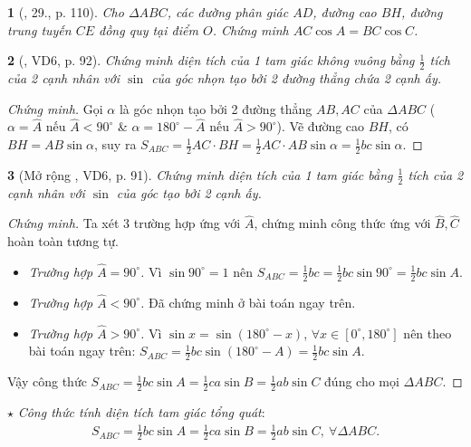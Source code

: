\documentclass{article}
\newtheorem{baitoan}{}
\begin{document}
\begin{baitoan}[\cite{Tuyen_Toan_9_old}, 29., p. 110]
	Cho $\Delta ABC$, các đường phân giác $AD$, đường cao $BH$, đường trung tuyến $CE$ đồng quy tại điểm $O$. Chứng minh $AC\cos A = BC\cos C$.
\end{baitoan}

\begin{baitoan}[\cite{Binh_Toan_9_tap_1}, VD6, p. 92]
	Chứng minh diện tích của 1 tam giác không vuông bằng $\frac{1}{2}$ tích của 2 cạnh nhân với $\sin$ của góc nhọn tạo bởi 2 đường thẳng chứa 2 cạnh ấy.
\end{baitoan}

\begin{proof}[Chứng minh]
	Gọi $\alpha$ là góc nhọn tạo bởi 2 đường thẳng $AB,AC$ của $\Delta ABC$ ($\alpha = \widehat{A}$ nếu $\widehat{A} < 90^\circ$ \& $\alpha = 180^\circ - \widehat{A}$ nếu $\widehat{A} > 90^\circ$). Vẽ đường cao $BH$, có $BH = AB\sin\alpha$, suy ra $S_{ABC} = \frac{1}{2}AC\cdot BH = \frac{1}{2}AC\cdot AB\sin\alpha = \frac{1}{2}bc\sin\alpha$.
\end{proof}

\begin{baitoan}[Mở rộng \cite{Binh_Toan_9_tap_1}, VD6, p. 91]
	Chứng minh diện tích của 1 tam giác bằng $\frac{1}{2}$ tích của 2 cạnh nhân với $\sin$ của góc tạo bởi 2 cạnh ấy.
\end{baitoan}

\begin{proof}[Chứng minh]
	Ta xét 3 trường hợp ứng với $\widehat{A}$, chứng minh công thức ứng với $\widehat{B},\widehat{C}$ hoàn toàn tương tự.
	\begin{itemize}
		\item \textit{Trường hợp $\widehat{A} = 90^\circ$.} Vì $\sin90^\circ = 1$ nên $S_{ABC} = \frac{1}{2}bc = \frac{1}{2}bc\sin90^\circ = \frac{1}{2}bc\sin A$.
		\item \textit{Trường hợp $\widehat{A} < 90^\circ$.} Đã chứng minh ở bài toán ngay trên.
		\item \textit{Trường hợp $\widehat{A} > 90^\circ$.} Vì $\sin x = \sin(180^\circ - x)$, $\forall x\in[0^\circ,180^\circ]$ nên theo bài toán ngay trên: $S_{ABC} = \frac{1}{2}bc\sin(180^\circ - A) = \frac{1}{2}bc\sin A$.
	\end{itemize}
	Vậy công thức $S_{ABC} = \frac{1}{2}bc\sin A = \frac{1}{2}ca\sin B = \frac{1}{2}ab\sin C$ đúng cho mọi $\Delta ABC$.
\end{proof}
\noindent$\star$ \textit{Công thức tính diện tích tam giác tổng quát}:
\begin{align*}
	\boxed{S_{ABC} = \frac{1}{2}bc\sin A = \frac{1}{2}ca\sin B = \frac{1}{2}ab\sin C,\ \forall\Delta ABC.}
\end{align*}
\end{document}
